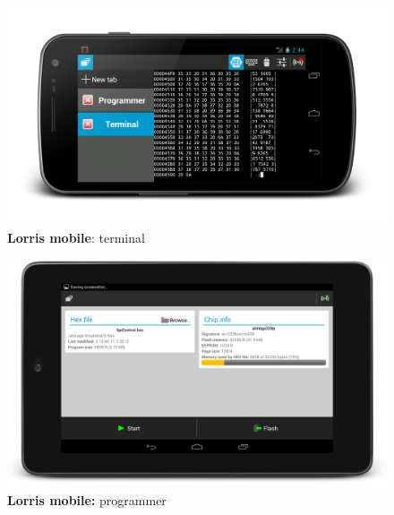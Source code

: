\documentclass[12pt, a4paper, oneside]{article}
\newcommand{\B}{\textbf} %
\begin{document}
\begin{figure}[H]
\begin{center}
\includegraphics[width=\textwidth]{../img/mobile.png}
\caption{\B{Lorris mobile}: terminal}
\end{center}
\end{figure}

\begin{figure}[H]
\begin{center}
\includegraphics[width=\textwidth]{../img/mobile_programmer.png}
\caption{\B{Lorris mobile:} programmer}
\end{center}
\end{figure}
\end{document}
